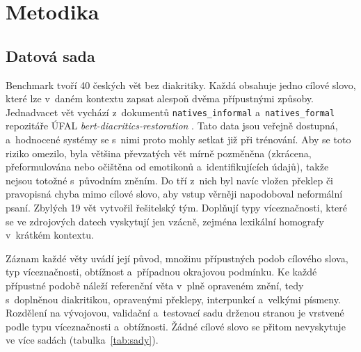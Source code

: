 \documentclass[11pt,a4paper]{article}
\begin{document}
\section{Metodika}
\label{sec:metodika}

\subsection{Datová sada}
\label{sec:data}

Benchmark tvoří 40 českých vět bez diakritiky. Každá obsahuje jedno
cílové slovo, které lze v~daném kontextu zapsat alespoň dvěma
přípustnými způsoby. Jednadvacet vět vychází z~dokumentů
\texttt{natives\_informal} a~\texttt{natives\_formal} repozitáře ÚFAL
\textit{bert-diacritics-restoration} \cite{naplava2021}. Tato data jsou
veřejně dostupná, a~hodnocené systémy se s~nimi proto mohly setkat již
při trénování. Aby se toto riziko omezilo, byla většina převzatých vět
mírně pozměněna (zkrácena, přeformulována nebo očištěna od emotikonů
a~identifikujících údajů), takže nejsou totožné s~původním zněním. Do
tří z~nich byl navíc vložen překlep či pravopisná chyba mimo cílové
slovo, aby vstup věrněji napodoboval neformální psaní. Zbylých 19 vět
vytvořil řešitelský tým. Doplňují typy víceznačnosti, které se ve
zdrojových datech vyskytují jen vzácně, zejména lexikální homografy
v~krátkém kontextu.

Záznam každé věty uvádí její původ, množinu přípustných podob cílového
slova, typ víceznačnosti, obtížnost a~případnou okrajovou podmínku.
Ke každé přípustné podobě náleží referenční věta v~plně opraveném znění,
tedy s~doplněnou diakritikou, opravenými překlepy, interpunkcí a~velkými
písmeny. Rozdělení na vývojovou, validační a~testovací sadu drženou
stranou je vrstvené podle typu víceznačnosti a~obtížnosti. Žádné cílové
slovo se přitom nevyskytuje ve více sadách
(tabulka~\ref{tab:sady}).
\end{document}

